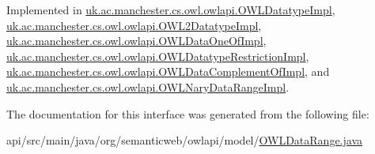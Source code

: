 Implemented in \hyperlink{classuk_1_1ac_1_1manchester_1_1cs_1_1owl_1_1owlapi_1_1_o_w_l_datatype_impl_a97259e98dbb0ad3d3c5f4b2c8ea9a2f0}{uk.\-ac.\-manchester.\-cs.\-owl.\-owlapi.\-O\-W\-L\-Datatype\-Impl}, \hyperlink{classuk_1_1ac_1_1manchester_1_1cs_1_1owl_1_1owlapi_1_1_o_w_l2_datatype_impl_aaa432de54b1997507649d1f4aed02577}{uk.\-ac.\-manchester.\-cs.\-owl.\-owlapi.\-O\-W\-L2\-Datatype\-Impl}, \hyperlink{classuk_1_1ac_1_1manchester_1_1cs_1_1owl_1_1owlapi_1_1_o_w_l_data_one_of_impl_a541387f825b9bc8023c7ed607d1da62c}{uk.\-ac.\-manchester.\-cs.\-owl.\-owlapi.\-O\-W\-L\-Data\-One\-Of\-Impl}, \hyperlink{classuk_1_1ac_1_1manchester_1_1cs_1_1owl_1_1owlapi_1_1_o_w_l_datatype_restriction_impl_ac591115314a95911c6f24d634a54305a}{uk.\-ac.\-manchester.\-cs.\-owl.\-owlapi.\-O\-W\-L\-Datatype\-Restriction\-Impl}, \hyperlink{classuk_1_1ac_1_1manchester_1_1cs_1_1owl_1_1owlapi_1_1_o_w_l_data_complement_of_impl_a8831f418241967ed2c49db1b608f59a0}{uk.\-ac.\-manchester.\-cs.\-owl.\-owlapi.\-O\-W\-L\-Data\-Complement\-Of\-Impl}, and \hyperlink{classuk_1_1ac_1_1manchester_1_1cs_1_1owl_1_1owlapi_1_1_o_w_l_nary_data_range_impl_a7664247445be2ef8910d383001bcc1c3}{uk.\-ac.\-manchester.\-cs.\-owl.\-owlapi.\-O\-W\-L\-Nary\-Data\-Range\-Impl}.



The documentation for this interface was generated from the following file\-:\begin{DoxyCompactItemize}
\item 
api/src/main/java/org/semanticweb/owlapi/model/\hyperlink{_o_w_l_data_range_8java}{O\-W\-L\-Data\-Range.\-java}\end{DoxyCompactItemize}
